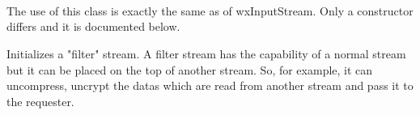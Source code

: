\section{}\label{wxfilterinputstream}


\\


The use of this class is exactly the same as of wxInputStream. Only a constructor
differs and it is documented below.



Initializes a "filter" stream. A filter stream has the capability of a normal
stream but it can be placed on the top of another stream. So, for example, it
can uncompress, uncrypt the datas which are read from another stream and pass it
to the requester.

